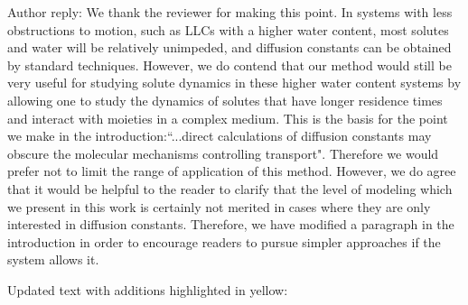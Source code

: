 \documentclass{article}
\begin{document}
\begin{enumerate}[label={Comment \theenumi :}, leftmargin=3.9\parindent]
    Author reply: We thank the reviewer for making this point. 
    In systems with less obstructions to motion, such as LLCs with a higher water content, most 
    solutes and water will be relatively unimpeded, and diffusion constants can be obtained by 
    standard techniques.    
    However, we do contend that our method would still be very useful for studying
    solute dynamics in these higher water content systems 
    by allowing one to study the dynamics of solutes that have longer residence times and interact
    with moieties in a complex medium. %
    This is the basis for the point we make in the introduction:``...direct calculations of diffusion 
    constants may obscure the molecular mechanisms controlling transport". Therefore we would
    prefer not to limit the range of application of this method. 
    However, we do agree that it would be helpful to the reader to clarify that the level of modeling 
    which we present in this work is certainly not merited in cases where they are only interested in
    diffusion constants. Therefore, we have modified a paragraph in the introduction in order to
    encourage readers to pursue simpler approaches if the system allows it.
    
    Updated text with additions highlighted in yellow:
    

\end{enumerate}
\end{document}
